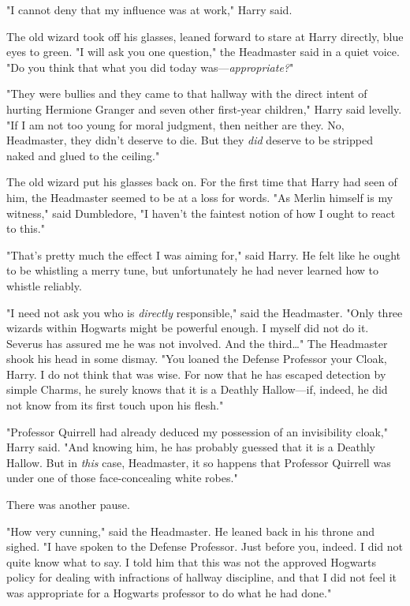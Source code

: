 "I cannot deny that my influence was at work," Harry said.

The old wizard took off his glasses, leaned forward to stare at Harry directly, 
blue eyes to green. "I will ask you one question," the Headmaster said in a 
quiet voice. "Do you think that what you did today was---\emph{appropriate?}"

"They were bullies and they came to that hallway with the direct intent of 
hurting Hermione Granger and seven other first-year children," Harry said 
levelly. "If I am not too young for moral judgment, then neither are they. No, 
Headmaster, they didn't deserve to die. But they \emph{did} deserve to be 
stripped naked and glued to the ceiling."

The old wizard put his glasses back on. For the first time that Harry had seen 
of him, the Headmaster seemed to be at a loss for words. "As Merlin himself is 
my witness," said Dumbledore, "I haven't the faintest notion of how I ought to 
react to this."

"That's pretty much the effect I was aiming for," said Harry. He felt like he 
ought to be whistling a merry tune, but unfortunately he had never learned how 
to whistle reliably.

"I need not ask you who is \emph{directly} responsible," said the Headmaster. 
"Only three wizards within Hogwarts might be powerful enough. I myself did not 
do it. Severus has assured me he was not involved. And the third{\ldots}" The 
Headmaster shook his head in some dismay. "You loaned the Defense Professor 
your Cloak, Harry. I do not think that was wise. For now that he has escaped 
detection by simple Charms, he surely knows that it is a Deathly Hallow---if, 
indeed, he did not know from its first touch upon his flesh."

"Professor Quirrell had already deduced my possession of an invisibility 
cloak," Harry said. "And knowing him, he has probably guessed that it is a 
Deathly Hallow. But in \emph{this} case, Headmaster, it so happens that 
Professor Quirrell was under one of those face-concealing white robes."

There was another pause.

"How very cunning," said the Headmaster. He leaned back in his throne and 
sighed. "I have spoken to the Defense Professor. Just before you, indeed. I did 
not quite know what to say. I told him that this was not the approved Hogwarts 
policy for dealing with infractions of hallway discipline, and that I did not 
feel it was appropriate for a Hogwarts professor to do what he had done."

